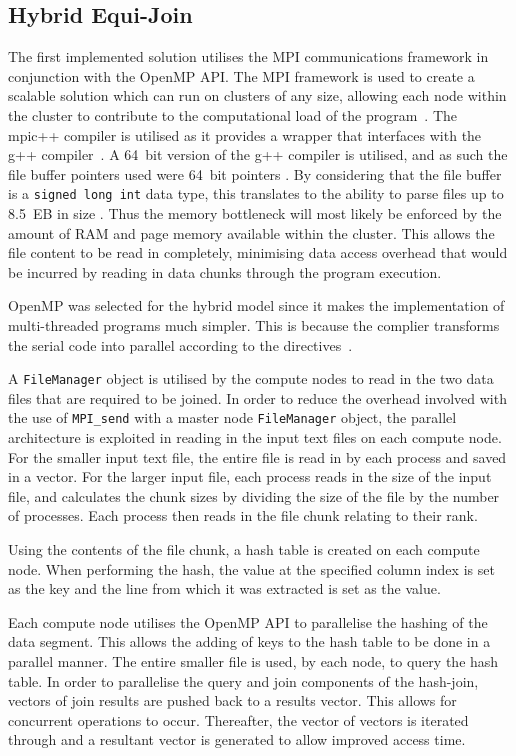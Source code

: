 \documentclass[12pt,twocolumn]{witseiepaper}
\begin{document}
\subsection{Hybrid Equi-Join}
The first implemented solution utilises the MPI communications framework in conjunction with the OpenMP API. The MPI framework is used to create a scalable solution which can run on clusters of any size, allowing each node within the cluster to contribute to the computational load of the program~\cite{mpi-scale}. The mpic++ compiler is utilised as it provides a wrapper that interfaces with the g++ compiler~\cite{mpic++-wrapper}. A 64~bit version of the g++ compiler is utilised, and as such the file buffer pointers used were 64~bit pointers \cite{pointer-size}. By considering that the file buffer is a \texttt{signed long int} data type, this translates to the ability to parse files up to 8.5~EB in size \cite{pointer-size}. Thus the memory bottleneck will most likely be enforced by the amount of RAM and page memory available within the cluster. This allows the file content to be read in completely, minimising data access overhead that would be incurred by reading in data chunks through the program execution.

OpenMP was selected for the hybrid model since it makes the implementation of multi-threaded programs much simpler. This is because the complier transforms the serial code into parallel according to the directives~\cite{comparingMPIMapReduce}.

A \texttt{FileManager} object is utilised by the compute nodes to read in the two data files that are required to be joined. In order to reduce the overhead involved with the use of \texttt{MPI\_send} with a master node \texttt{FileManager} object, the parallel architecture is exploited in reading in the input text files on each compute node. For the smaller input text file, the entire file is read in by each process and saved in a vector. For the larger input file, each process reads in the size of the input file, and calculates the chunk sizes by dividing the size of the file by the number of processes. Each process then reads in the file chunk relating to their rank.

Using the contents of the file chunk, a hash table is created on each compute node. When performing the hash, the value at the specified column index is set as the key and the line from which it was extracted is set as the value.

Each compute node utilises the OpenMP API to parallelise the hashing of the data segment. This allows the adding of keys to the hash table to be done in a parallel manner. The entire smaller file is used, by each node, to query the hash table. In order to parallelise the query and join components of the hash-join, vectors of join results are pushed back to a results vector. This allows for concurrent operations to occur. Thereafter, the vector of vectors is iterated through and a resultant vector is generated to allow improved access time.
\end{document}
